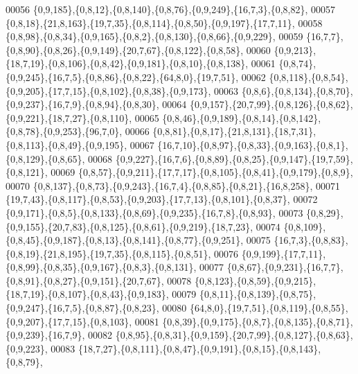 \begin{DoxyCode}
00056         \{0,9,185\},\{0,8,12\},\{0,8,140\},\{0,8,76\},\{0,9,249\},\{16,7,3\},\{0,8,82\},
00057         \{0,8,18\},\{21,8,163\},\{19,7,35\},\{0,8,114\},\{0,8,50\},\{0,9,197\},\{17,7,11\},
00058         \{0,8,98\},\{0,8,34\},\{0,9,165\},\{0,8,2\},\{0,8,130\},\{0,8,66\},\{0,9,229\},
00059         \{16,7,7\},\{0,8,90\},\{0,8,26\},\{0,9,149\},\{20,7,67\},\{0,8,122\},\{0,8,58\},
00060         \{0,9,213\},\{18,7,19\},\{0,8,106\},\{0,8,42\},\{0,9,181\},\{0,8,10\},\{0,8,138\},
00061         \{0,8,74\},\{0,9,245\},\{16,7,5\},\{0,8,86\},\{0,8,22\},\{64,8,0\},\{19,7,51\},
00062         \{0,8,118\},\{0,8,54\},\{0,9,205\},\{17,7,15\},\{0,8,102\},\{0,8,38\},\{0,9,173\},
00063         \{0,8,6\},\{0,8,134\},\{0,8,70\},\{0,9,237\},\{16,7,9\},\{0,8,94\},\{0,8,30\},
00064         \{0,9,157\},\{20,7,99\},\{0,8,126\},\{0,8,62\},\{0,9,221\},\{18,7,27\},\{0,8,110\},
00065         \{0,8,46\},\{0,9,189\},\{0,8,14\},\{0,8,142\},\{0,8,78\},\{0,9,253\},\{96,7,0\},
00066         \{0,8,81\},\{0,8,17\},\{21,8,131\},\{18,7,31\},\{0,8,113\},\{0,8,49\},\{0,9,195\},
00067         \{16,7,10\},\{0,8,97\},\{0,8,33\},\{0,9,163\},\{0,8,1\},\{0,8,129\},\{0,8,65\},
00068         \{0,9,227\},\{16,7,6\},\{0,8,89\},\{0,8,25\},\{0,9,147\},\{19,7,59\},\{0,8,121\},
00069         \{0,8,57\},\{0,9,211\},\{17,7,17\},\{0,8,105\},\{0,8,41\},\{0,9,179\},\{0,8,9\},
00070         \{0,8,137\},\{0,8,73\},\{0,9,243\},\{16,7,4\},\{0,8,85\},\{0,8,21\},\{16,8,258\},
00071         \{19,7,43\},\{0,8,117\},\{0,8,53\},\{0,9,203\},\{17,7,13\},\{0,8,101\},\{0,8,37\},
00072         \{0,9,171\},\{0,8,5\},\{0,8,133\},\{0,8,69\},\{0,9,235\},\{16,7,8\},\{0,8,93\},
00073         \{0,8,29\},\{0,9,155\},\{20,7,83\},\{0,8,125\},\{0,8,61\},\{0,9,219\},\{18,7,23\},
00074         \{0,8,109\},\{0,8,45\},\{0,9,187\},\{0,8,13\},\{0,8,141\},\{0,8,77\},\{0,9,251\},
00075         \{16,7,3\},\{0,8,83\},\{0,8,19\},\{21,8,195\},\{19,7,35\},\{0,8,115\},\{0,8,51\},
00076         \{0,9,199\},\{17,7,11\},\{0,8,99\},\{0,8,35\},\{0,9,167\},\{0,8,3\},\{0,8,131\},
00077         \{0,8,67\},\{0,9,231\},\{16,7,7\},\{0,8,91\},\{0,8,27\},\{0,9,151\},\{20,7,67\},
00078         \{0,8,123\},\{0,8,59\},\{0,9,215\},\{18,7,19\},\{0,8,107\},\{0,8,43\},\{0,9,183\},
00079         \{0,8,11\},\{0,8,139\},\{0,8,75\},\{0,9,247\},\{16,7,5\},\{0,8,87\},\{0,8,23\},
00080         \{64,8,0\},\{19,7,51\},\{0,8,119\},\{0,8,55\},\{0,9,207\},\{17,7,15\},\{0,8,103\},
00081         \{0,8,39\},\{0,9,175\},\{0,8,7\},\{0,8,135\},\{0,8,71\},\{0,9,239\},\{16,7,9\},
00082         \{0,8,95\},\{0,8,31\},\{0,9,159\},\{20,7,99\},\{0,8,127\},\{0,8,63\},\{0,9,223\},
00083         \{18,7,27\},\{0,8,111\},\{0,8,47\},\{0,9,191\},\{0,8,15\},\{0,8,143\},\{0,8,79\},

\end{DoxyCode}
